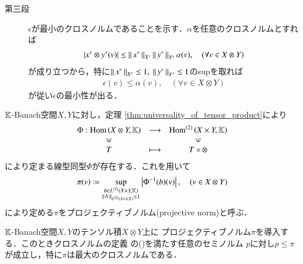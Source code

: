 \begin{prf}
\begin{description}
			\item[第三段]
				$\epsilon$が最小のクロスノルムであることを示す．$\alpha$を任意のクロスノルムとすれば
				\begin{align}
					\left| x^* \otimes y^* (v) \right| \leq \Norm{x^*}{X^*} \Norm{y^*}{Y^*} \alpha(v),
					\quad (\forall v \in X \otimes Y)
				\end{align}
				が成り立つから，特に$\Norm{x^*}{X^*} \leq 1,\ \Norm{y^*}{Y^*} \leq 1$のsupを取れば
				\begin{align}
					\epsilon(v) \leq \alpha(v),
					\quad (\forall v \in X \otimes Y)
				\end{align}
				が従い$\epsilon$の最小性が出る．
				\QED
		\end{description}
	\end{prf}
	
	\begin{screen}
		\begin{dfn}[プロジェクティブノルム]
			$\K$-Banach空間$X,Y$に対し，定理
			\ref{thm:universality_of_tensor_product}により
			\begin{align}
				\begin{array}{ccc}
					\Phi:\Hom{X \otimes Y}{\K} & \longrightarrow & \Ln{X \times Y}{\K}{2} \\
					\rotatebox{90}{$\in$} & & \rotatebox{90}{$\in$} \\
					T & \longmapsto & T \circ \otimes
					\label{eq:dfn_projective_norm_isomorphism}
				\end{array}
			\end{align}
			により定まる線型同型$\Phi$が存在する．これを用いて
			\begin{align}
				\pi(v) \coloneqq
				\sup{\substack{b \in \ContLn{X \times Y}{\K}{2} \\ \Norm{b}{\ContLn{X \times Y}{\K}{2}} \leq 1}}{\left| \Phi^{-1}(b)(v) \right|},
				\quad (v \in X \otimes Y)
			\end{align}
			により定める$\pi$をプロジェクティブノルム(projective norm)と呼ぶ．
		\end{dfn}
	\end{screen}
	
	\begin{screen}
		\begin{thm}[プロジェクティブノルムは最大のクロスノルム]
		\label{thm:projective_norm_is_maximum_cross_norm}
			$\K$-Banach空間$X,Y$のテンソル積$X \otimes Y$上に
			プロジェクティブノルム$\pi$を導入する．このときクロスノルムの定義
			の()を満たす任意のセミノルム
			$p$に対し$p \leq \pi$が成立し，特に$\pi$は最大のクロスノルムである．
		\end{thm}
	\end{screen}
	
